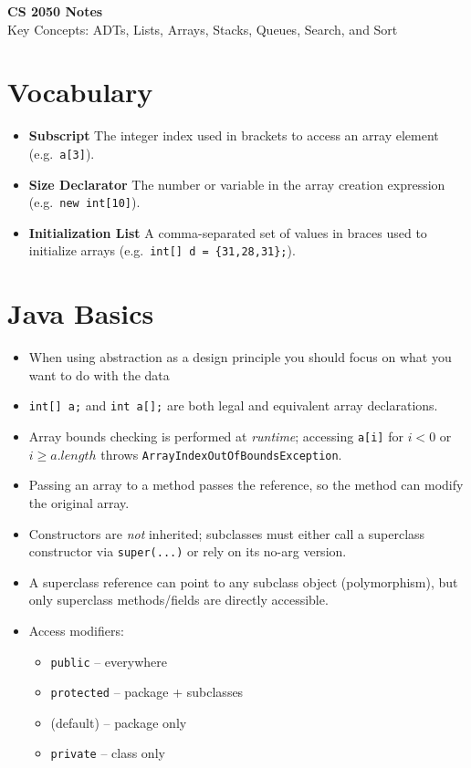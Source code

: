 \documentclass[11pt]{article}
\begin{document}
\begin{center}
\LARGE{\textbf{CS 2050 Notes}} \\
\vspace{0.5em}
\large{Key Concepts: ADTs, Lists, Arrays, Stacks, Queues, Search, and Sort}
\end{center}
\vspace{1em}

\section*{Vocabulary}
\begin{itemize}
  \item \textbf{Subscript}  
    The integer index used in brackets to access an array element (e.g.\ \verb|a[3]|).
  \item \textbf{Size Declarator}  
    The number or variable in the array creation expression (e.g.\ \verb|new int[10]|).
  \item \textbf{Initialization List}  
    A comma-separated set of values in braces used to initialize arrays (e.g.\ \verb|int[] d = {31,28,31};|).
\end{itemize}

\section*{Java Basics}
\begin{itemize}
  \item When using abstraction as a design principle you should focus on what you want to do with the data
  \item \verb|int[] a;| and \verb|int a[];| are both legal and equivalent array declarations.
  \item Array bounds checking is performed at \emph{runtime}; accessing \verb|a[i]| for \(i<0\) or \(i\ge a.length\) throws \texttt{ArrayIndexOutOfBoundsException}.
  \item Passing an array to a method passes the reference, so the method can modify the original array.
  \item Constructors are \emph{not} inherited; subclasses must either call a superclass constructor via \verb|super(...)| or rely on its no-arg version.
  \item A superclass reference can point to any subclass object (polymorphism), but only superclass methods/fields are directly accessible.
  \item Access modifiers:  
    \begin{itemize}
      \item \texttt{public} – everywhere  
      \item \texttt{protected} – package + subclasses  
      \item (default) – package only  
      \item \texttt{private} – class only  
    \end{itemize}
\end{itemize}
\end{document}
